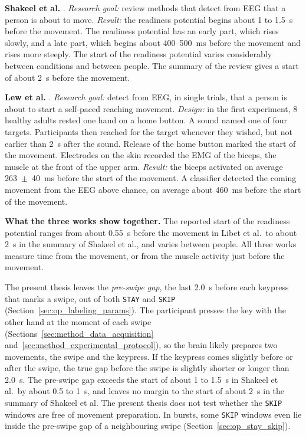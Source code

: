 \documentclass[12pt,a4paper]{report}
\begin{document}
\textbf{Shakeel et al.} \cite{shakeel_review_2015}. \emph{Research goal:} review methods that detect from EEG that a person is about to move. \emph{Result:} the readiness potential begins about 1 to 1.5~s before the movement. The readiness potential has an early part, which rises slowly, and a late part, which begins about 400--500~ms before the movement and rises more steeply. The start of the readiness potential varies considerably between conditions and between people. The summary of the review gives a start of about 2~s before the movement.

\textbf{Lew et al.} \cite{lew_detection_2012}. \emph{Research goal:} detect from EEG, in single trials, that a person is about to start a self-paced reaching movement. \emph{Design:} in the first experiment, 8 healthy adults rested one hand on a home button. A sound named one of four targets. Participants then reached for the target whenever they wished, but not earlier than 2~s after the sound. Release of the home button marked the start of the movement. Electrodes on the skin recorded the EMG of the biceps, the muscle at the front of the upper arm. \emph{Result:} the biceps activated on average 263~$\pm$~40~ms before the start of the movement. A classifier detected the coming movement from the EEG above chance, on average about 460~ms before the start of the movement.

\textbf{What the three works show together.} The reported start of the readiness potential ranges from about 0.55~s before the movement in Libet et al.\ to about 2~s in the summary of Shakeel et al., and varies between people. All three works measure time from the movement, or from the muscle activity just before the movement.

The present thesis leaves the \emph{pre-swipe gap}, the last 2.0~s before each keypress that marks a swipe, out of both \texttt{STAY} and \texttt{SKIP} (Section~\ref{sec:op_labeling_params}). The participant presses the key with the other hand at the moment of each swipe (Sections~\ref{sec:method_data_acquisition} and~\ref{sec:method_experimental_protocol}), so the brain likely prepares two movements, the swipe and the keypress. If the keypress comes slightly before or after the swipe, the true gap before the swipe is slightly shorter or longer than 2.0~s. The pre-swipe gap exceeds the start of about 1 to 1.5~s in Shakeel et al.\ by about 0.5 to 1~s, and leaves no margin to the start of about 2~s in the summary of Shakeel et al. The present thesis does not test whether the \texttt{SKIP} windows are free of movement preparation. In bursts, some \texttt{SKIP} windows even lie inside the pre-swipe gap of a neighbouring swipe (Section~\ref{sec:op_stay_skip}).
\end{document}

